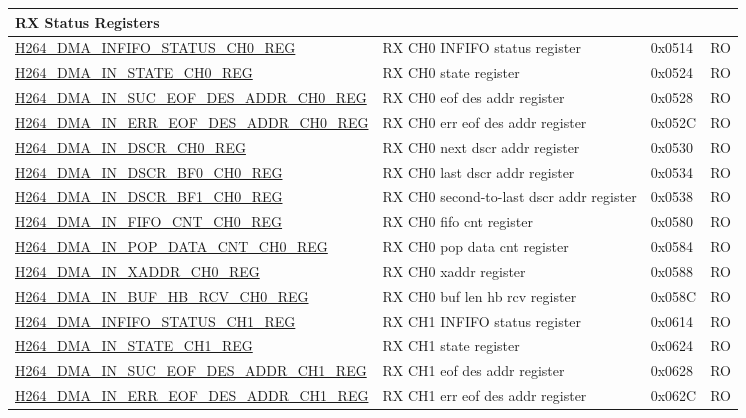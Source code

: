 \begin{longtable}{ | p{7.5cm} | p{5.7cm} | p{1.2cm} | p{1.5cm} | }
\multicolumn{4}{|l|}{\textbf{RX Status Registers}} \\ \hline
\hyperref[regdesc:H264DMAINFIFOSTATUSCH0REG]{H264\_DMA\_INFIFO\_STATUS\_CH0\_REG} & RX CH0 INFIFO status register & 0x0514 & RO \\ \hline
\hyperref[regdesc:H264DMAINSTATECH0REG]{H264\_DMA\_IN\_STATE\_CH0\_REG} & RX CH0 state register & 0x0524 & RO \\ \hline
\hyperref[regdesc:H264DMAINSUCEOFDESADDRCH0REG]{H264\_DMA\_IN\_SUC\_EOF\_DES\_ADDR\_CH0\_REG} & RX CH0 eof des addr register & 0x0528 & RO \\ \hline
\hyperref[regdesc:H264DMAINERREOFDESADDRCH0REG]{H264\_DMA\_IN\_ERR\_EOF\_DES\_ADDR\_CH0\_REG} & RX CH0 err eof des addr register & 0x052C & RO \\ \hline
\hyperref[regdesc:H264DMAINDSCRCH0REG]{H264\_DMA\_IN\_DSCR\_CH0\_REG} & RX CH0 next dscr addr register & 0x0530 & RO \\ \hline
\hyperref[regdesc:H264DMAINDSCRBF0CH0REG]{H264\_DMA\_IN\_DSCR\_BF0\_CH0\_REG} & RX CH0 last dscr addr register & 0x0534 & RO \\ \hline
\hyperref[regdesc:H264DMAINDSCRBF1CH0REG]{H264\_DMA\_IN\_DSCR\_BF1\_CH0\_REG} & RX CH0 second-to-last dscr addr register & 0x0538 & RO \\ \hline
\hyperref[regdesc:H264DMAINFIFOCNTCH0REG]{H264\_DMA\_IN\_FIFO\_CNT\_CH0\_REG} & RX CH0 fifo cnt register & 0x0580 & RO \\ \hline
\hyperref[regdesc:H264DMAINPOPDATACNTCH0REG]{H264\_DMA\_IN\_POP\_DATA\_CNT\_CH0\_REG} & RX CH0 pop data cnt register & 0x0584 & RO \\ \hline
\hyperref[regdesc:H264DMAINXADDRCH0REG]{H264\_DMA\_IN\_XADDR\_CH0\_REG} & RX CH0 xaddr register & 0x0588 & RO \\ \hline
\hyperref[regdesc:H264DMAINBUFHBRCVCH0REG]{H264\_DMA\_IN\_BUF\_HB\_RCV\_CH0\_REG} & RX CH0 buf len hb rcv register & 0x058C & RO \\ \hline
\hyperref[regdesc:H264DMAINFIFOSTATUSCH1REG]{H264\_DMA\_INFIFO\_STATUS\_CH1\_REG} & RX CH1 INFIFO status register & 0x0614 & RO \\ \hline
\hyperref[regdesc:H264DMAINSTATECH1REG]{H264\_DMA\_IN\_STATE\_CH1\_REG} & RX CH1 state register & 0x0624 & RO \\ \hline
\hyperref[regdesc:H264DMAINSUCEOFDESADDRCH1REG]{H264\_DMA\_IN\_SUC\_EOF\_DES\_ADDR\_CH1\_REG} & RX CH1 eof des addr register & 0x0628 & RO \\ \hline
\hyperref[regdesc:H264DMAINERREOFDESADDRCH1REG]{H264\_DMA\_IN\_ERR\_EOF\_DES\_ADDR\_CH1\_REG} & RX CH1 err eof des addr register & 0x062C & RO \\ \hline

\end{longtable}
